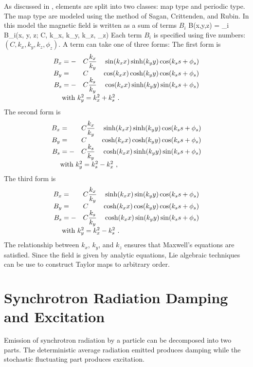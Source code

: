 As discussed in , \bmad {} elements are
split into two classes: map type and periodic type. The map type
 are modeled using the method of Sagan, Crittenden, and
Rubin\cite{b:wiggler}. In this model the magnetic field is written as
a sum of terms $B_i$
\Begineq
  B(x,y,z) = \sum_i B_i(x, y, z; C, k_x, k_y, k_z, \phi_z)
\Endeq 
Each term $B_i$ is specified using five numbers: 
$(C, k_x, k_y, k_z, \phi_z)$. A term can take one of three forms: The first
form is
\begin{alignat}{4}
  B_x &= -&C &\dfrac{k_x}{k_y} & \sin(\kxx) \sinh(\kyy) \cos(\ksss) \CRNEG
  B_y &=  &C &                 & \cos(\kxx) \cosh(\kyy) \cos(\ksss) \CRNEG
  B_s &= -&C &\dfrac{k_s}{k_y} & \cos(\kxx) \sinh(\kyy) \sin(\ksss) \CRneg
  & \makebox[1pt][l]{with $k_y^2 = k_x^2 + k_s^2$ .} &&&  \label{f1}
\end{alignat}
The second form is
\begin{alignat}{4}
  B_x &=  &C &\dfrac{k_x}{k_y} & \sinh(\kxx) \sinh(\kyy) \cos(\ksss) \CRNEG
  B_y &=  &C &                 & \cosh(\kxx) \cosh(\kyy) \cos(\ksss) \CRNEG
  B_s &= -&C &\dfrac{k_s}{k_y} & \cosh(\kxx) \sinh(\kyy) \sin(\ksss) \CRneg
  & \makebox[1pt][l]{with $k_y^2 = k_s^2 - k_x^2$ ,} &&&  \label{f2}
\end{alignat}
The third form is
\begin{alignat}{4}
  B_x &=  &C &\dfrac{k_x}{k_y} & \sinh(\kxx) \sin(\kyy) \cos(\ksss) \CRNEG
  B_y &=  &C &                 & \cosh(\kxx) \cos(\kyy) \cos(\ksss) \CRNEG
  B_s &= -&C &\dfrac{k_s}{k_y} & \cosh(\kxx) \sin(\kyy) \sin(\ksss) \CRneg
  & \makebox[1pt][l]{with $k_y^2 = k_x^2 - k_s^2$ .} &&& \label{f3}
\end{alignat}
The relationship between $k_x$, $k_y$, and $k_z$ ensures that Maxwell's equations
are satisfied. Since the field is given by analytic equations, Lie algebraic
techniques can be use to construct Taylor maps to arbitrary order.

\section{Synchrotron Radiation Damping and Excitation}
\label{s:radiation}

Emission of synchrotron radiation by a particle can be decomposed into
two parts. The deterministic average radiation emitted produces damping
while the stochastic fluctuating part produces excitation\cite{b:jowett}.

